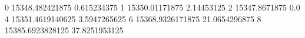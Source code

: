 0 15348.482421875 0.615234375
1 15350.01171875 2.14453125
2 15347.8671875 0.0
4 15351.4619140625 3.5947265625
6 15368.9326171875 21.0654296875
8 15385.6923828125 37.8251953125
